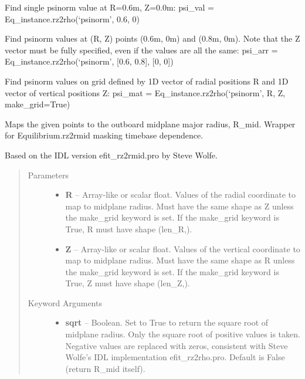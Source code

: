 \documentclass[letterpaper,10pt,english]{sphinxmanual}
\begin{document}
\begin{fulllineitems}
\begin{fulllineitems}
Find single psinorm value at R=0.6m, Z=0.0m:
psi\_val = Eq\_instance.rz2rho(`psinorm', 0.6, 0)

Find psinorm values at (R, Z) points (0.6m, 0m) and (0.8m, 0m).
Note that the Z vector must be fully specified,
even if the values are all the same:
psi\_arr = Eq\_instance.rz2rho(`psinorm', {[}0.6, 0.8{]}, {[}0, 0{]})

Find psinorm values on grid defined by 1D vector of radial positions R
and 1D vector of vertical positions Z:
psi\_mat = Eq\_instance.rz2rho(`psinorm', R, Z, make\_grid=True)

\end{fulllineitems}


\begin{fulllineitems}
\label{eqtools:eqtools.eqdskreader.EqdskReader.rz2rmid}
Maps the given points to the outboard midplane major radius, R\_mid.
Wrapper for Equilibrium.rz2rmid masking timebase dependence.

Based on the IDL version efit\_rz2rmid.pro by Steve Wolfe.
\begin{quote}\begin{description}
\item[{Parameters }] \leavevmode\begin{itemize}
\item {} 
\textbf{R} --
Array-like or scalar float. Values of the radial coordinate to
map to midplane radius. Must have the same shape as Z unless
the make\_grid keyword is set. If the make\_grid keyword is True,
R must have shape (len\_R,).

\item {} 
\textbf{Z} --
Array-like or scalar float. Values of the vertical coordinate to
map to midplane radius. Must have the same shape as R unless the
make\_grid keyword is set. If the make\_grid keyword is True, Z
must have shape (len\_Z,).

\end{itemize}

\item[{Keyword Arguments}] \leavevmode\begin{itemize}
\item {} 
\textbf{sqrt} --
Boolean. Set to True to return the square root of midplane
radius. Only the square root of positive values is taken.
Negative values are replaced with zeros, consistent with Steve
Wolfe's IDL implementation efit\_rz2rho.pro. Default is False
(return R\_mid itself).


\end{itemize}
\end{description}
\end{quote}
\end{fulllineitems}
\end{fulllineitems}
\end{document}

